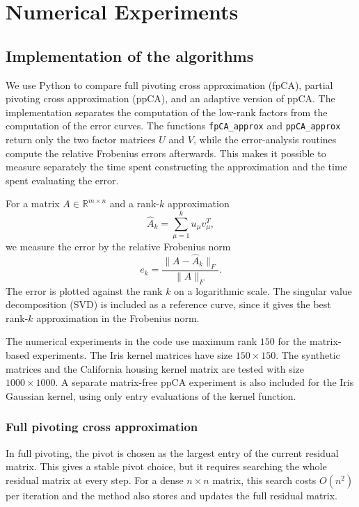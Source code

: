 \section{Numerical Experiments}

\subsection{Implementation of the algorithms}

We use Python to compare full pivoting cross approximation (fpCA), partial pivoting cross approximation (ppCA), and an adaptive version of ppCA. The implementation separates the computation of the low-rank factors from the computation of the error curves. The functions \texttt{fpCA\_approx} and \texttt{ppCA\_approx} return only the two factor matrices $U$ and $V$, while the error-analysis routines compute the relative Frobenius errors afterwards. This makes it possible to measure separately the time spent constructing the approximation and the time spent evaluating the error.

For a matrix $A \in \mathbb{R}^{m \times n}$ and a rank-$k$ approximation
\[
  \widehat{A}_k = \sum_{\mu=1}^{k} u_\mu v_\mu^T,
\]
we measure the error by the relative Frobenius norm
\[
  e_k = \frac{\|A - \widehat{A}_k\|_F}{\|A\|_F}.
\]
The error is plotted against the rank $k$ on a logarithmic scale. The singular value decomposition (SVD) is included as a reference curve, since it gives the best rank-$k$ approximation in the Frobenius norm.

The numerical experiments in the code use maximum rank $150$ for the matrix-based experiments. The Iris kernel matrices have size $150 \times 150$. The synthetic matrices and the California housing kernel matrix are tested with size $1000 \times 1000$. A separate matrix-free ppCA experiment is also included for the Iris Gaussian kernel, using only entry evaluations of the kernel function.

\subsubsection*{Full pivoting cross approximation}

In full pivoting, the pivot is chosen as the largest entry of the current residual matrix. This gives a stable pivot choice, but it requires searching the whole residual matrix at every step. For a dense $n \times n$ matrix, this search costs $O(n^2)$ per iteration and the method also stores and updates the full residual matrix.

